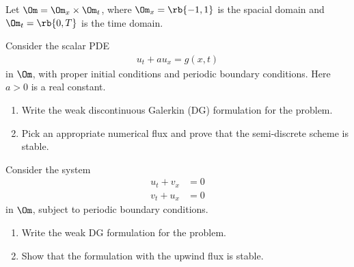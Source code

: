 \documentclass{article}
\begin{document}










Let $\Om=\Om_x\times\Om_t$, where $\Om_x=\rb{-1,1}$ is the spacial domain and $\Om_t=\rb{0,T}$ is the time domain.

\begin{exerciseList}




\item
Consider the scalar PDE
\begin{gather} \label{WEH}
	u_t+au_x=g(x,t)
\end{gather}%
in $\Om$, with proper initial conditions and periodic boundary conditions.
Here $a>0$ is a real constant.
\begin{enumerate}

\item
Write the weak discontinuous Galerkin (DG) formulation for the problem.

\item
Pick an appropriate numerical flux and prove that the semi-discrete scheme is stable.
\end{enumerate}




\item
Consider the system 
\begin{gather}%
	u_{t}+v_{x} &=0\\
	v_{t}+u_{x} &=0
\end{gather}%
in $\Om$, subject to periodic boundary conditions.
\begin{enumerate}

\item
Write the weak DG formulation for the problem.

\item
Show that the formulation with the upwind flux is stable.
\end{enumerate}




\end{exerciseList}
\end{document}

